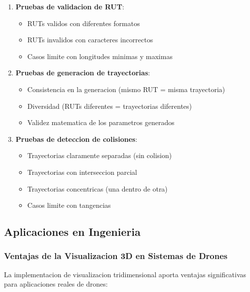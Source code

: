 \documentclass[12pt,a4paper]{article}
\begin{document}
\begin{enumerate}
    \item \textbf{Pruebas de validacion de RUT}:
    \begin{itemize}
        \item RUTs validos con diferentes formatos
        \item RUTs invalidos con caracteres incorrectos
        \item Casos limite con longitudes minimas y maximas
    \end{itemize}
    
    \item \textbf{Pruebas de generacion de trayectorias}:
    \begin{itemize}
        \item Consistencia en la generacion (mismo RUT = misma trayectoria)
        \item Diversidad (RUTs diferentes = trayectorias diferentes)
        \item Validez matematica de los parametros generados
    \end{itemize}
    
    \item \textbf{Pruebas de deteccion de colisiones}:
    \begin{itemize}
        \item Trayectorias claramente separadas (sin colision)
        \item Trayectorias con interseccion parcial
        \item Trayectorias concentricas (una dentro de otra)
        \item Casos limite con tangencias
    \end{itemize}
\end{enumerate}

\subsection{Aplicaciones en Ingenieria}

\subsubsection{Ventajas de la Visualizacion 3D en Sistemas de Drones}

La implementacion de visualizacion tridimensional aporta ventajas significativas para aplicaciones reales de drones:
\end{document}
